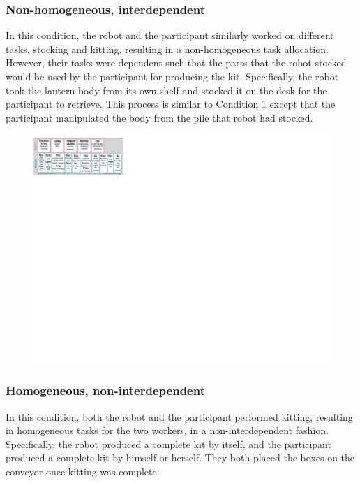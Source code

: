 \subsubsection{Non-homogeneous, interdependent} In this condition, the robot and the participant similarly worked on different tasks, stocking and kitting, resulting in  a non-homogeneous task allocation. However, their tasks were dependent such that the parts that the robot stocked would be used by the participant for producing the kit. Specifically, the robot took the lantern body from its own shelf and stocked it on the desk for the participant to retrieve. This process is similar to Condition 1 except that the participant manipulated the body from the pile that robot had stocked.
\begin{figure}[H]
\vspace{0pt}
\begin{center}
\includegraphics[width=1.55\textwidth]{condition2.pdf}
\end{center}
\vspace{-500pt}
\end{figure}
\subsubsection{Homogeneous, non-interdependent} In this condition, both the robot and the participant performed kitting, resulting in homogeneous tasks for the two workers, in a non-interdependent fashion. Specifically, the robot produced a complete kit by itself, and the participant produced a complete kit by himself or herself. They both placed the boxes on the conveyor once kitting was complete.
